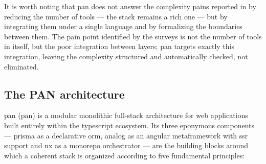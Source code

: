 It is worth noting that \gls{pan} does not answer the complexity pains reported in  by reducing the number of tools --- the stack remains a rich one --- but by integrating them under a single language and by formalizing the boundaries between them. The pain point identified by the surveys is not the number of tools in itself, but the poor integration between layers; \gls{pan} targets exactly this integration, leaving the complexity structured and automatically checked, not eliminated.

\subsection{The PAN architecture}\label{subsec:pan-definitie}

\gls{pan} (\acrlong{pan}) is a modular monolithic full-stack architecture for \gls{web} applications built entirely within the \gls{typescript} ecosystem.
Its three eponymous components --- \gls{prisma} as a declarative \gls{orm}, \gls{analog} as an \gls{angular} \gls{metaframework} with \acrshort{ssr} support and \gls{nx} as a \gls{monorepo} orchestrator --- are the building blocks around which a coherent stack is organized according to five fundamental principles:

